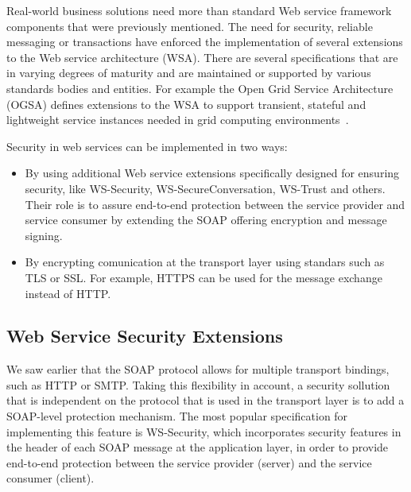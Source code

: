 Real-world business solutions need more than standard Web service framework components that were previously mentioned. The need for security, reliable messaging or transactions have enforced the implementation of several extensions to the Web service architecture (WSA). There are several specifications that are in varying degrees of maturity and are maintained or supported by various standards bodies and entities. For example the Open Grid Service Architecture (OGSA) defines extensions to the WSA to support transient, stateful and lightweight service instances needed in grid computing environments~\cite{ogf-ws-ext}.

Security in web services can be implemented in two ways:

\begin{itemize}
 \item By using additional Web service extensions specifically designed for ensuring security, like WS-Security, WS-SecureConversation, WS-Trust and others. Their role is to assure end-to-end protection between the service provider and service consumer by extending the SOAP offering encryption and message signing.
 \item By encrypting comunication at the transport layer using standars such as TLS or SSL. For example, HTTPS can be used for the message exchange instead of HTTP.
\end{itemize}

\subsection{Web Service Security Extensions}
\label{subsec:ws-sec-ext}

We saw earlier that the SOAP protocol allows for multiple transport bindings, such as HTTP or SMTP. Taking this flexibility in account, a security  sollution that is independent on the protocol that is used in the transport layer is to add a SOAP-level protection mechanism. The most popular specification for implementing this feature is WS-Security, which incorporates security features in the header of each SOAP message at the application layer, in order to provide end-to-end protection between the service provider (server) and the service consumer (client).

